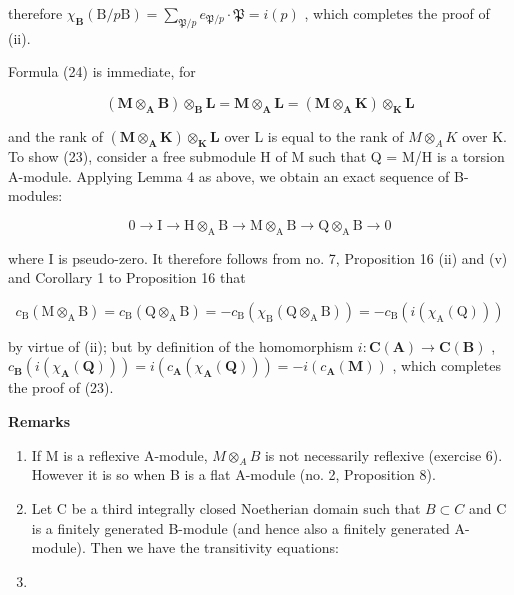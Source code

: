therefore \(\chi_{\mathbf{B}}(\mathrm{B} / p\mathrm{B}) = \sum_{\mathfrak{P} / p}e_{\mathfrak{P} / p}\cdot \mathfrak{P} = i(p)\) , which completes the proof of (ii).

Formula (24) is immediate, for

\[
(\mathbf {M} \otimes_ {\mathbf {A}} \mathbf {B}) \otimes_ {\mathbf {B}} \mathbf {L} = \mathbf {M} \otimes_ {\mathbf {A}} \mathbf {L} = (\mathbf {M} \otimes_ {\mathbf {A}} \mathbf {K}) \otimes_ {\mathbf {K}} \mathbf {L}
\]

and the rank of \((\mathbf{M} \otimes_{\mathbf{A}} \mathbf{K}) \otimes_{\mathbf{K}} \mathbf{L}\) over L is equal to the rank of \(M \otimes_{A} K\) over K. To show (23), consider a free submodule H of M such that Q = M/H is a torsion A-module. Applying Lemma 4 as above, we obtain an exact sequence of B-modules:

\[
0 \rightarrow \mathrm{I} \rightarrow \mathrm{H} \otimes_ {\mathrm{A}} \mathrm{B} \rightarrow \mathrm{M} \otimes_ {\mathrm{A}} \mathrm{B} \rightarrow \mathrm{Q} \otimes_ {\mathrm{A}} \mathrm{B} \rightarrow 0
\]

where I is pseudo-zero. It therefore follows from no. 7, Proposition 16 (ii) and (v) and Corollary 1 to Proposition 16 that

\[
c _ {\mathrm{B}} (\mathrm{M} \otimes_ {\mathrm{A}} \mathrm{B}) = c _ {\mathrm{B}} (\mathrm{Q} \otimes_ {\mathrm{A}} \mathrm{B}) = - c _ {\mathrm{B}} \left(\chi_ {\mathrm{B}} (\mathrm{Q} \otimes_ {\mathrm{A}} \mathrm{B})\right) = - c _ {\mathrm{B}} (i \left(\chi_ {\mathrm{A}} (\mathrm{Q})\right))
\]

by virtue of (ii); but by definition of the homomorphism \(i: \mathbf{C}(\mathbf{A}) \to \mathbf{C}(\mathbf{B})\) , \(c_{\mathbf{B}}(i(\chi_{\mathbf{A}}(\mathbf{Q}))) = i(c_{\mathbf{A}}(\chi_{\mathbf{A}}(\mathbf{Q}))) = -i(c_{\mathbf{A}}(\mathbf{M}))\) , which completes the proof of (23).

\textbf{Remarks}\par

\begin{enumerate}
\def\labelenumi{(\arabic{enumi})}
\item
  If M is a reflexive A-module, \(M \otimes_{A} B\) is not necessarily reflexive (exercise 6). However it is so when B is a flat A-module (no. 2, Proposition 8).
\item
  Let C be a third integrally closed Noetherian domain such that \(B \subset C\) and C is a finitely generated B-module (and hence also a finitely generated A-module). Then we have the transitivity equations:
\item
\end{enumerate}

